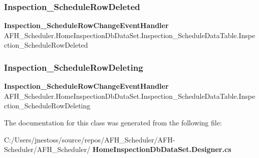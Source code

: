 \subsubsection{Inspection\_ScheduleRowDeleted}
{\footnotesize\ttfamily \textbf{ Inspection\+\_\+\+Schedule\+Row\+Change\+Event\+Handler} A\+F\+H\+\_\+\+Scheduler.\+Home\+Inspection\+Db\+Data\+Set.\+Inspection\+\_\+\+Schedule\+Data\+Table.\+Inspection\+\_\+\+Schedule\+Row\+Deleted}

\mbox{\label{class_a_f_h___scheduler_1_1_home_inspection_db_data_set_1_1_inspection___schedule_data_table_a712d17dd16f0c05cd93cb29bfe277aff}} 
\subsubsection{Inspection\_ScheduleRowDeleting}
{\footnotesize\ttfamily \textbf{ Inspection\+\_\+\+Schedule\+Row\+Change\+Event\+Handler} A\+F\+H\+\_\+\+Scheduler.\+Home\+Inspection\+Db\+Data\+Set.\+Inspection\+\_\+\+Schedule\+Data\+Table.\+Inspection\+\_\+\+Schedule\+Row\+Deleting}



The documentation for this class was generated from the following file\+:\begin{DoxyCompactItemize}
\item 
C\+:/\+Users/jnestoss/source/repos/\+A\+F\+H\+\_\+\+Scheduler/\+A\+F\+H-\/\+Scheduler/\+A\+F\+H\+\_\+\+Scheduler/\textbf{ Home\+Inspection\+Db\+Data\+Set.\+Designer.\+cs}\end{DoxyCompactItemize}
